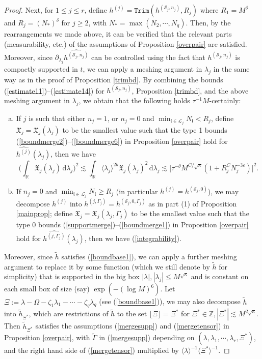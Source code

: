 \documentclass[11 pt,reqno]{amsart}
\theoremstyle{definition}
\theoremstyle{remark}
\numberwithin{equation}{section}
\newcommand{\Sc}{\mathcal{S}}
\newcommand{\Lc}{\mathcal{L}}
\newcommand{\Rb}{\mathbb{R}}
\newcommand{\Zb}{\mathbb{Z}}
\newcommand{\Xf}{\mathfrak{X}}
\newcommand{\lf}{\mathfrak{l}}
\begin{document}
{\begin{proof}
Next, for $1\leq j\leq r$, define $h^{(j)}=\mathtt{Trim}(h^{(\Sc_j,n_j)},R_j)$ where $R_1=M^\delta$ and $R_j=(N_*)^\delta$ for $j\geq 2$, with $N_*=\max(N_2,\cdots,N_q)$. Then, by the rearrangements we made above, it can be verified that the relevant parts (measurability, etc.) of the assumptions of Proposition \ref{overpair} are satisfied. Moreover, since $\partial_{\lambda_j}\widehat{h^{(\Sc_j,n_j)}}$ can be controlled using the fact that $h^{(\Sc_j,n_j)}$ is compactly supported in $t$, we can apply a meshing argument in $\lambda_j$ in the same way as in the proof of Proposition \ref{trimbd}. By combining the bounds (\ref{estimate11})--(\ref{estimate14}) for $h^{(\Sc_j,n_j)}$, Proposition \ref{trimbd}, and the above meshing argument in $\lambda_j$, we obtain that the following holds $\tau^{-1}M$-certainly:
\begin{enumerate}[(a)]
\item If $j$ is such that either $n_j=1$, or $n_j=0$ and $\min_{\lf\in\Lc_j}N_\lf<R_j$, define $\Xf_j=\Xf_j(\lambda_j)$ to be the smallest value such that the type 1 bounds (\ref{boundmerge2})--(\ref{boundmerge6}) in Proposition \ref{overpair} hold for $\widehat{h^{(j)}}(\lambda_j)$, then we have
\begin{equation}\label{integrability1}\bigg(\int_\Rb\Xf_j(\lambda_j)\,\mathrm{d}\lambda_j\bigg)^2\lesssim\int_\Rb\langle \lambda_j\rangle^{2b}\Xf_j(\lambda_j)^2\,\mathrm{d}\lambda_j\lesssim\big[\tau^{-\theta}M^{C/\sqrt{\kappa}}(1+R_j^CN_j^{-3\varepsilon})\big]^2.
\end{equation}
\item If $n_j=0$ and $\min_{\lf\in\Lc_j}N_\lf\geq R_j$ (in particular $h^{(j)}=h^{(\Sc_j,0)}$), we may decompose $h^{(j)}$ into $h^{(j,\Gamma_j)}=h^{(\Sc_j,0,\Gamma_j)}$ as in part (1) of Proposition \ref{mainprop}; define $\Xf_j=\Xf_j(\lambda_j,\Gamma_j)$ to be the smallest value such that the type 0 bounds (\ref{supportmerge})--(\ref{boundmerge1}) in Proposition \ref{overpair} hold for $\widehat{h^{(j,\Gamma_j)}}(\lambda_j)$, then we have (\ref{integrability}).
\end{enumerate} Moreover, since $\widetilde{h}$ satisfies (\ref{boundbase1}), we can apply a further meshing argument to replace it by some function (which we still denote by $\widetilde{h}$ for simplicity) that is supported in the big box $|\lambda|,|\lambda_j|\leq M^{\sqrt{\kappa}}$ and is constant on each small box of size (say) $\exp(-(\log M)^6)$. Let $\Xi:=\lambda-\Omega-\zeta_1\lambda_1-\cdots-\zeta_q\lambda_q$ (see (\ref{boundbase1})), we may also decompose $\widetilde{h}$ into $\widetilde{h}_{\Xi^*}$, which are restrictions of $\widetilde{h}$ to the set $\lfloor\Xi\rfloor=\Xi^*$ for $\Xi^*\in\Zb,|\Xi^*|\lesssim M^{2\sqrt{\kappa}}$.  Then $\widetilde{h}_{\Xi^*}$ satisfies the assumptions (\ref{mergesupp}) and (\ref{mergetensor}) in Proposition \ref{overpair}, with $\widetilde{\Gamma}$ in (\ref{mergesupp}) depending on $(\lambda,\lambda_1,\cdots,\lambda_r,\Xi^*)$, and the right hand side of (\ref{mergetensor}) multiplied by $\langle\lambda\rangle^{-1}\langle\Xi^*\rangle^{-1}$.


\end{proof}}
\end{document}
